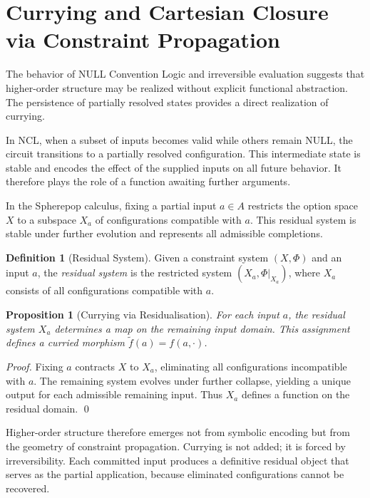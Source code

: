 \documentclass[12pt, oneside]{amsbook}
\theoremstyle{plain}
\newtheorem{proposition}[theorem]{Proposition}
\theoremstyle{definition}
\newtheorem{definition}[theorem]{Definition}
\theoremstyle{remark}
\begin{document}
\section{Currying and Cartesian Closure via Constraint Propagation}
\label{sec:var:ccc}

The behavior of NULL Convention Logic and irreversible evaluation suggests that
higher-order structure may be realized without explicit functional abstraction.
The persistence of partially resolved states provides a direct realization of
currying.

In NCL, when a subset of inputs becomes valid while others remain NULL, the
circuit transitions to a partially resolved configuration. This intermediate
state is stable and encodes the effect of the supplied inputs on all future
behavior. It therefore plays the role of a function awaiting further arguments.

In the Spherepop calculus, fixing a partial input $a \in A$ restricts the
option space $X$ to a subspace $X_a$ of configurations compatible with $a$.
This residual system is stable under further evolution and represents all
admissible completions.

\begin{definition}[Residual System]
\label{def:residual}
Given a constraint system $(X, \Phi)$ and an input $a$, the \emph{residual
system} is the restricted system $(X_a, \Phi|_{X_a})$, where $X_a$ consists
of all configurations compatible with $a$.
\end{definition}

\begin{proposition}[Currying via Residualisation]
\label{prop:currying}
For each input $a$, the residual system $X_a$ determines a map on the
remaining input domain. This assignment defines a curried morphism
$\tilde{f}(a) = f(a, \cdot)$.
\end{proposition}

\begin{proof}
Fixing $a$ contracts $X$ to $X_a$, eliminating all configurations
incompatible with $a$. The remaining system evolves under further collapse,
yielding a unique output for each admissible remaining input. Thus $X_a$
defines a function on the residual domain. \qed
\end{proof}

Higher-order structure therefore emerges not from symbolic encoding but from
the geometry of constraint propagation. Currying is not added; it is forced by
irreversibility. Each committed input produces a definitive residual object
that serves as the partial application, because eliminated configurations
cannot be recovered.
\end{document}
